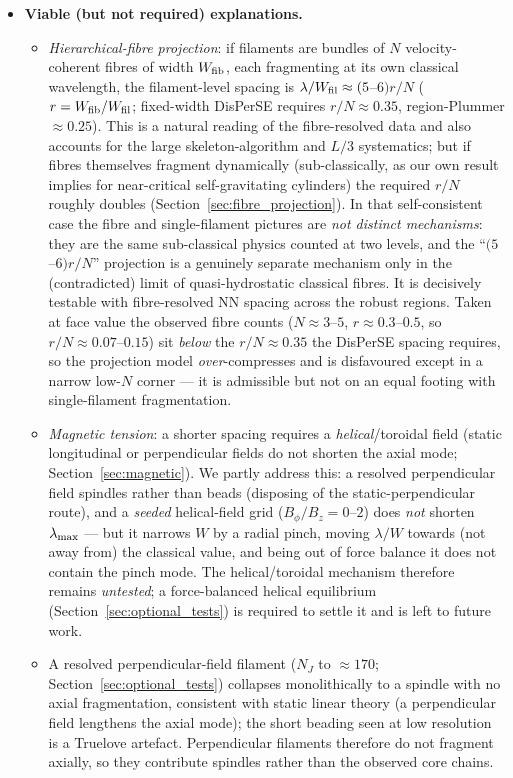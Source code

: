 \documentclass[usenatbib,twoside,twocolumn]{mnras}
\begin{document}
\begin{itemize}
    \item \textbf{Viable (but not required) explanations.}
    \begin{itemize}
        \item \emph{Hierarchical-fibre projection}: if filaments are bundles of $N$ velocity-coherent fibres of width $W_{\rm fib}$, each fragmenting at its own classical wavelength, the filament-level spacing is $\lambda/W_{\rm fil}\approx(5$--$6)r/N$ ($r=W_{\rm fib}/W_{\rm fil}$; fixed-width DisPerSE requires $r/N\approx0.35$, region-Plummer $\approx0.25$). This is a natural reading of the fibre-resolved data \citep{Yang2024,Hacar2013} and also accounts for the large skeleton-algorithm and $L/3$ systematics; but if fibres themselves fragment dynamically (sub-classically, as our own result implies for near-critical self-gravitating cylinders) the required $r/N$ roughly doubles (Section~\ref{sec:fibre_projection}). In that self-consistent case the fibre and single-filament pictures are \emph{not distinct mechanisms}: they are the same sub-classical physics counted at two levels, and the ``$(5$--$6)r/N$'' projection is a genuinely separate mechanism only in the (contradicted) limit of quasi-hydrostatic classical fibres. It is decisively testable with fibre-resolved NN spacing across the robust regions. Taken at face value the observed fibre counts ($N\approx3$--$5$, $r\approx0.3$--$0.5$, so $r/N\approx0.07$--$0.15$) sit \emph{below} the $r/N\approx0.35$ the DisPerSE spacing requires, so the projection model \emph{over}-compresses and is disfavoured except in a narrow low-$N$ corner --- it is admissible but not on an equal footing with single-filament fragmentation.
        \item \emph{Magnetic tension}: a shorter spacing requires a \emph{helical}/toroidal field \citep{Fiege2000} (static longitudinal or perpendicular fields do not shorten the axial mode; Section~\ref{sec:magnetic}). We partly address this: a resolved perpendicular field spindles rather than beads (disposing of the static-perpendicular route), and a \emph{seeded} helical-field grid ($B_\phi/B_z=0$--$2$) does \emph{not} shorten $\lambda_{\rm max}$ --- but it narrows $W$ by a radial pinch, moving $\lambda/W$ towards (not away from) the classical value, and being out of force balance it does not contain the \citet{Fiege2000} pinch mode. The helical/toroidal mechanism therefore remains \emph{untested}; a force-balanced helical equilibrium (Section~\ref{sec:optional_tests}) is required to settle it and is left to future work.
        \item A resolved perpendicular-field filament ($N_J$ to $\approx170$; Section~\ref{sec:optional_tests}) collapses monolithically to a spindle with no axial fragmentation, consistent with static linear theory (a perpendicular field lengthens the axial mode); the short beading seen at low resolution is a Truelove artefact. Perpendicular filaments therefore do not fragment axially, so they contribute spindles rather than the observed core chains.
    \end{itemize}


\end{itemize}
\end{document}

